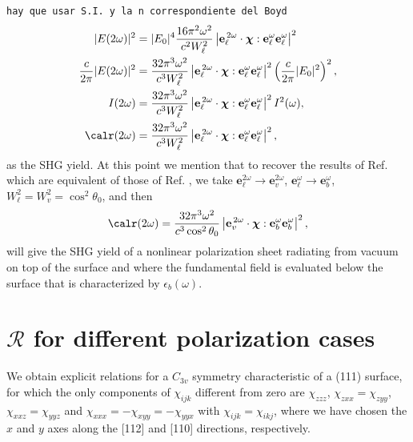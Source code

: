 \documentclass[aps,11pt]{revtex4}
\begin{document}
\verb=hay que usar S.I. y la n correspondiente del Boyd=
\begin{align}\label{r01}
|E(2\omega)|^2 
&= |E_{0}|^4\frac{16\pi^{2}\omega^{2}}{c^{2}W^2_\ell}
\left\vert
\mathbf{e}^{\,2\omega}_{\ell}\cdot\boldsymbol{\chi}:
\mathbf{e}^{\omega}_{\ell}\mathbf{e}^{\omega}_{\ell}
\right\vert^{2}
\nonumber\\
\frac{c}{2\pi}|E(2\omega)|^{2} 
&= \frac{32\pi^{3}\omega^{2}}{c^{3}W^2_\ell}
\left\vert
\mathbf{e}^{\,2\omega}_{\ell}\cdot\boldsymbol{\chi}:
\mathbf{e}^{\omega}_{\ell}\mathbf{e}^{\omega}_{\ell}
\right\vert^{2} 
\left(\frac{c}{2\pi}|E_{0}|^{2}\right)^{2},
\nonumber\\
I(2\omega) 
&= \frac{32\pi^{3}\omega^{2}}{c^{3}W^2_\ell}
\left\vert
\mathbf{e}^{\,2\omega}_{\ell}\cdot\boldsymbol{\chi}:
\mathbf{e}^\omega_{\ell}\mathbf{e}^\omega_{\ell}
\right\vert^{2}I^{2}(\omega),
\nonumber\\
\calr(2\omega) 
&= \frac{32\pi^{3}\omega^{2}}{c^{3}W^2_\ell}
\left\vert
\mathbf{e}^{\,2\omega}_{\ell}\cdot\boldsymbol{\chi}:
\mathbf{e}^{\omega}_{\ell}\mathbf{e}^{\omega}_{\ell}\right\vert^{2} 
,
\end{align}
as the SHG yield. At this point we mention that to recover the results of Ref.
\cite{mizrahiJOSA88} which are equivalent of those of Ref. \cite{sipePRB87}, we
take $\mathbf{e}^{2\omega}_{\ell}\to \mathbf{e}^{2\omega}_v$,
$\mathbf{e}^{\omega}_{\ell}\to \mathbf{e}^{\omega}_{b}$, 
$W^2_\ell=W^2_v=\cos^2\theta_0$,
and then
\begin{equation}\label{m69}
\calr(2\omega) =
\frac{32\pi^{3} \omega^{2}}{c^{3}\cos^{2}\theta_0}
\left\vert
\mathbf{e}^{\,2\omega}_{v}\cdot\boldsymbol{\chi}:
\mathbf{e}^{\omega}_{b}\mathbf{e}^{\omega}_{b}
\right\vert^{2} 
,
\end{equation}
will give the SHG yield of a nonlinear polarization sheet radiating from vacuum
on top of the surface and where the fundamental field is evaluated below the
surface that is characterized by $\epsilon_{b}(\omega)$.


\section{\texorpdfstring{$\mathcal{R}$}{R} 
for different polarization
  cases} 

We obtain explicit relations for a $C_{3v}$ symmetry characteristic of a (111)
surface, for which the only components of $\chi_{ijk}$ different from zero are
$\chi_{zzz}$, $\chi_{zxx}=\chi_{zyy}$, $\chi_{xxz}=\chi_{yyz}$ and
$\chi_{xxx}=-\chi_{xyy}=-\chi_{yyx}$ with $\chi_{ijk}=\chi_{ikj}$, where we
have chosen the $x$ and $y$ axes along the [112] and [110] directions,
respectively.
\end{document}
